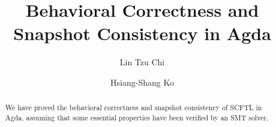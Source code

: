 \documentclass[letterpaper,twocolumn,10pt]{article}
\theoremstyle{definition}
\begin{document}
\title{Behavioral Correctness and Snapshot Consistency in Agda}
\author{Lin Tzu Chi \and Hsiang-Shang Ko}
\maketitle

\begin{abstract}
We have proved the behavioral correctness and snapshot consistency of SCFTL in Agda, assuming that some essential properties have been verified by an SMT solver.
\end{abstract}












\end{document}
